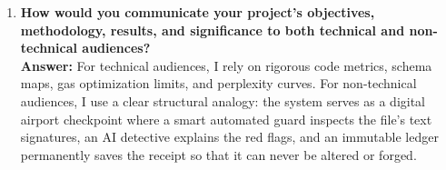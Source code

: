 \begin{enumerate}[label=\roman*.]
    \item \textbf{How would you communicate your project's objectives, methodology, results, and significance to both technical and non-technical audiences?} \\
    \textbf{Answer:} For technical audiences, I rely on rigorous code metrics, schema maps, gas optimization limits, and perplexity curves. For non-technical audiences, I use a clear structural analogy: the system serves as a digital airport checkpoint where a smart automated guard inspects the file's text signatures, an AI detective explains the red flags, and an immutable ledger permanently saves the receipt so that it can never be altered or forged.
\end{enumerate}